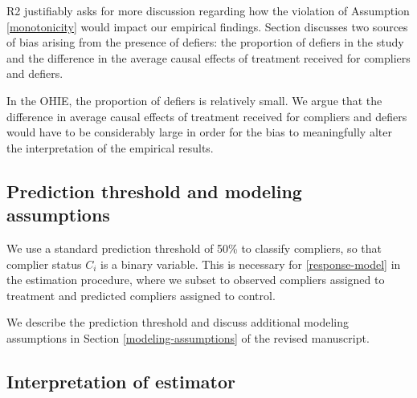 \documentclass[hidelinks,12pt,letterpaper]{article}
\begin{document}

R2 justifiably asks for more discussion regarding how the violation of Assumption \ref{monotonicity} would impact our empirical findings. Section \label{sens-defiers} discusses two sources of bias arising from the presence of defiers: the proportion of defiers in the study and the difference in the average causal effects of treatment received for compliers and defiers. 

In the OHIE, the proportion of defiers is relatively small. We argue that the difference in average causal effects of treatment received for compliers and defiers would have to be considerably large in order for the bias to meaningfully alter the interpretation of the empirical results. 

\subsection{Prediction threshold and modeling assumptions}\label{prediction-threshold}


We use a standard prediction threshold of 50\% to classify compliers, so that complier status $C_i$ is a binary variable. This is necessary for \ref{response-model} in the estimation procedure, where we subset to observed compliers assigned to treatment and predicted compliers assigned to control. 

We describe the prediction threshold and discuss additional modeling assumptions in Section \ref{modeling-assumptions} of the revised manuscript. 

\subsection{Interpretation of estimator}
\end{document}

